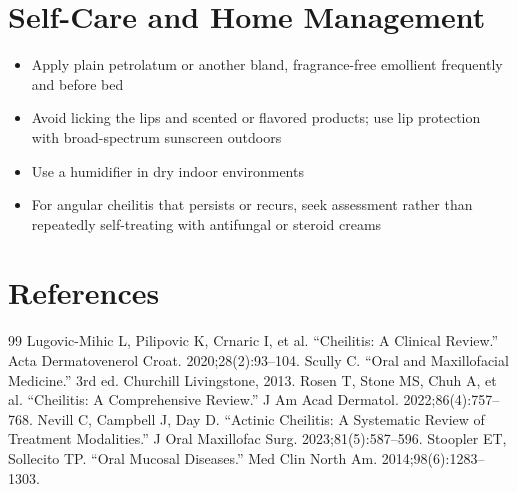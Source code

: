 \section*{Self-Care and Home Management}
\begin{itemize}
  \item Apply plain petrolatum or another bland, fragrance-free emollient frequently and before bed
  \item Avoid licking the lips and scented or flavored products; use lip protection with broad-spectrum sunscreen outdoors
  \item Use a humidifier in dry indoor environments
  \item For angular cheilitis that persists or recurs, seek assessment rather than repeatedly self-treating with antifungal or steroid creams
\end{itemize}

\section*{References}
\begin{thebibliography}{99}
 Lugovic-Mihic L, Pilipovic K, Crnaric I, et al. ``Cheilitis: A Clinical Review.'' Acta Dermatovenerol Croat. 2020;28(2):93--104.
 Scully C. ``Oral and Maxillofacial Medicine.'' 3rd ed. Churchill Livingstone, 2013.
 Rosen T, Stone MS, Chuh A, et al. ``Cheilitis: A Comprehensive Review.'' J Am Acad Dermatol. 2022;86(4):757--768.
 Nevill C, Campbell J, Day D. ``Actinic Cheilitis: A Systematic Review of Treatment Modalities.'' J Oral Maxillofac Surg. 2023;81(5):587--596.
 Stoopler ET, Sollecito TP. ``Oral Mucosal Diseases.'' Med Clin North Am. 2014;98(6):1283--1303.
\end{thebibliography}
